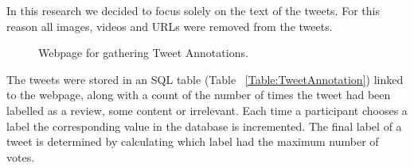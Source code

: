In this research we decided to focus solely on the text of the tweets. For this reason all images, videos and URLs were removed from the tweets.

\begin{figure}[h!]
\centering
{}
\caption{\label{fig:webpage} Webpage for gathering Tweet Annotations.}
\end{figure}

The tweets were stored in an SQL table (Table ~\ref{Table:TweetAnnotation}) linked to the webpage, along with a count of the number of times the tweet had been labelled as a review, some content or irrelevant. Each time a participant chooses a label the corresponding value in the database is incremented. The final label of a tweet is determined by calculating which label had the maximum number of votes. 


